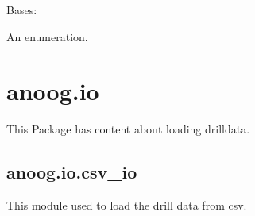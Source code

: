 \documentclass[letterpaper,10pt,english]{sphinxmanual}
\begin{document}
\begin{fulllineitems}
\label{\detokenize{anoog.automation:anoog.automation.py_exe_interface.op}}
\sphinxAtStartPar
Bases: 

\sphinxAtStartPar
An enumeration.

\begin{fulllineitems}
\label{\detokenize{anoog.automation:anoog.automation.py_exe_interface.op.LINUX}}
\end{fulllineitems}


\begin{fulllineitems}
\label{\detokenize{anoog.automation:anoog.automation.py_exe_interface.op.WINDOWS}}
\end{fulllineitems}


\end{fulllineitems}



\section{anoog.io}
\label{\detokenize{anoog.io:anoog-io}}\label{\detokenize{anoog.io::doc}}
\sphinxAtStartPar
This Package has content about loading drill\sphinxhyphen{}data.


\subsection{anoog.io.csv\_io}
\label{\detokenize{anoog.io:module-anoog.io.csv_io}}\label{\detokenize{anoog.io:anoog-io-csv-io}}
\sphinxAtStartPar
This module used to load the drill data from csv.
\end{document}
